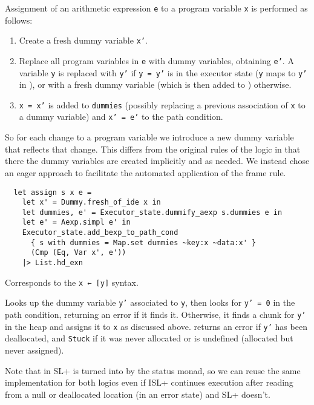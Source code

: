 \documentclass[parskip=half]{scrartcl}
\begin{document}
Assignment of an arithmetic expression \texttt{e} to a program variable \texttt{x} is performed as follows:
\begin{enumerate}
\item Create a fresh dummy variable \texttt{x'}.
\item Replace all program variables in \texttt{e} with dummy variables, obtaining \texttt{e'}. A variable \texttt{y} is replaced with \texttt{y'} if \texttt{y = y'} is in the executor state (\ie \texttt{y} maps to \texttt{y'} in ), or with a fresh dummy variable (which is then added to ) otherwise.
\item \texttt{x = x'} is added to \texttt{dummies} (possibly replacing a previous association of \texttt{x} to a dummy variable) and \texttt{x' = e'} to the path condition.
\end{enumerate}

So for each change to a program variable we introduce a new dummy variable that reflects that change. This differs from the original rules of the logic in that there the dummy variables are created implicitly and as needed. We instead chose an eager approach to facilitate the automated application of the frame rule.

\begin{verbatim}
  let assign s x e =
    let x' = Dummy.fresh_of_ide x in
    let dummies, e' = Executor_state.dummify_aexp s.dummies e in
    let e' = Aexp.simpl e' in
    Executor_state.add_bexp_to_path_cond
      { s with dummies = Map.set dummies ~key:x ~data:x' }
      (Cmp (Eq, Var x', e'))
    |> List.hd_exn
\end{verbatim}


Corresponds to the \texttt{x ← [y]} syntax.

Looks up the dummy variable \texttt{y'} associated to \texttt{y}, then looks for \texttt{y' = 0} in the path condition, returning an error if it finds it. Otherwise, it finds a chunk for \texttt{y'} in the heap and assigns it to \texttt{x} as discussed above.  returns an error if \texttt{y'} has been deallocated, and \texttt{Stuck} if it was never allocated or is undefined (allocated but never assigned).

Note that in SL+  is turned into  by the status monad, so we can reuse the same implementation for both logics even if ISL+ continues execution after reading from a null or deallocated location (in an error state) and SL+ doesn't.
\end{document}
